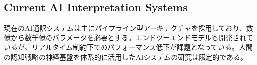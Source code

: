 \subsection{Current AI Interpretation Systems}

現在のAI通訳システムは主にパイプライン型アーキテクチャを採用しており、数億から数千億のパラメータを必要とする。エンドツーエンドモデルも開発されているが、リアルタイム制約下でのパフォーマンス低下が課題となっている。人間の認知戦略の神経基盤を体系的に活用したAIシステムの研究は限定的である。 